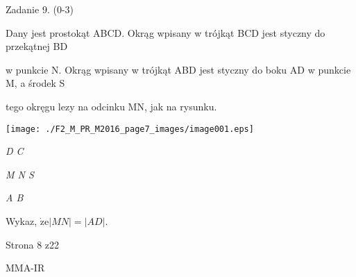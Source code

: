 \documentclass[a4paper,12pt]{article}
\begin{document}
Zadanie 9. (0-3)

Dany jest prostokąt ABCD. Okrąg wpisany w trójkąt BCD jest styczny do przekątnej BD

w punkcie N. Okrąg wpisany w trójkąt ABD jest styczny do boku AD w punkcie M, a środek S

tego okręgu lezy na odcinku MN, jak na rysunku.
\begin{center}
\texttt{[image: ./F2\_M\_PR\_M2016\_page7\_images/image001.eps]}
\end{center}
{\it D C}

{\it M  N  S}

{\it A  B}

Wykaz, $\dot{\mathrm{z}}\mathrm{e}|MN|=|AD|.$

Strona 8 z22

MMA-IR
\end{document}
